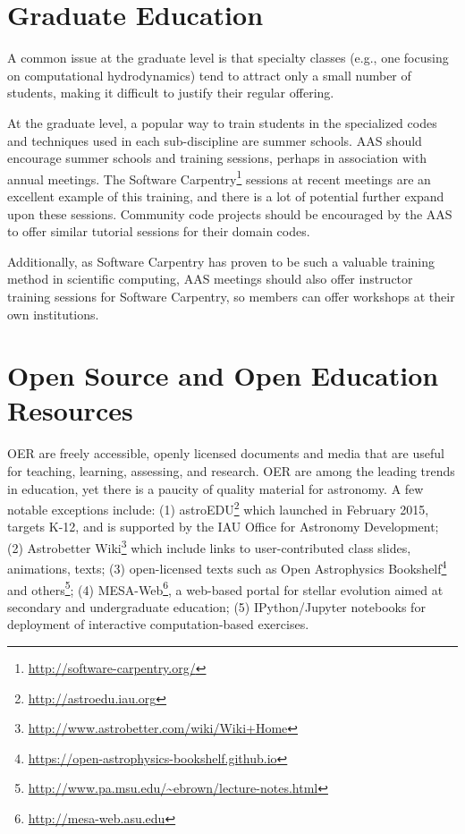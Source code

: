 \documentclass[11pt]{article}
\begin{document}
\section{Graduate Education}

A common issue at the graduate level is that specialty classes (e.g.,
one focusing on computational hydrodynamics) tend to attract only a
small number of students, making it difficult to justify their regular
offering.

At the graduate level, a popular way to train students in the
specialized codes and techniques used in each sub-discipline are summer
schools.  AAS should encourage summer schools and training sessions,
perhaps in association with annual meetings.  The Software
Carpentry\footnote{\url{http://software-carpentry.org/}} sessions at
recent meetings are an excellent example of this training, and there is a lot of
potential further expand upon these sessions.  Community code projects should be
encouraged by the AAS to offer similar tutorial sessions for their domain
codes.

Additionally, as Software Carpentry has proven to be such a valuable
training method in scientific computing, AAS meetings should also
offer instructor training sessions for Software Carpentry, so members
can offer workshops at their own institutions.


\section{Open Source and Open Education Resources}

OER are freely accessible, openly
licensed documents and media that are useful for teaching, learning,
assessing, and research. OER are among the leading trends in 
education, yet there is a paucity of quality material for
astronomy. A few notable exceptions include: (1)
astroEDU\footnote{\url{http://astroedu.iau.org}} which
launched in February 2015, targets K-12, and is supported by the IAU
Office for Astronomy Development; (2) Astrobetter
Wiki\footnote{\url{http://www.astrobetter.com/wiki/Wiki+Home}} which
include links to user-contributed class slides, animations, texts;
(3) open-licensed texts such as Open Astrophysics Bookshelf\footnote{\url{https://open-astrophysics-bookshelf.github.io}}
and others\footnote{\url{http://www.pa.msu.edu/~ebrown/lecture-notes.html}};
(4) MESA-Web\footnote{\url{http://mesa-web.asu.edu}}, a
web-based portal for stellar evolution aimed at secondary and undergraduate education;
(5) IPython/Jupyter notebooks for deployment of interactive computation-based exercises.
\end{document}
